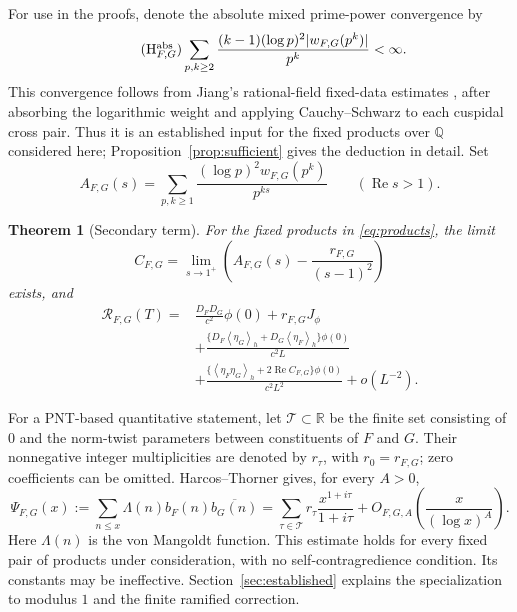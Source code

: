 \documentclass[11pt]{article}
\numberwithin{equation}{section}
\newtheorem{theorem}{Theorem}[section]
\theoremstyle{remark}
\newcommand{\R}{\mathbb R}
\newcommand{\Q}{\mathbb Q}
\newcommand{\Rea}{\operatorname{Re}}
\newcommand{\av}[1]{\left\langle #1\right\rangle_h}
\begin{document}
For use in the proofs, denote the absolute mixed prime-power convergence by
\begin{equation*}\tag{$\mathrm H_{F,G}^{\rm abs}$}\label{eq:Habs}
 \sum_{p,k\geq2}\frac{(k-1)(\log p)^2
              |w_{F,G}(p^k)|}{p^k}<\infty.
\end{equation*}
This convergence follows from Jiang's rational-field fixed-data
estimates \cite{Jiang}, after absorbing the logarithmic weight and
applying Cauchy--Schwarz to each cuspidal cross pair. Thus it is an
established input for the fixed products over $\Q$ considered here;
Proposition~\ref{prop:sufficient} gives the deduction in detail.
Set
\begin{equation}\label{eq:Aseries}
 A_{F,G}(s)=\sum_{p,k\geq1}
       \frac{(\log p)^2 w_{F,G}(p^k)}{p^{ks}}
       \qquad(\Rea s>1).
\end{equation}

\begin{theorem}[Secondary term]\label{thm:qualitative}
For the fixed products in \eqref{eq:products}, the limit
\begin{equation}\label{eq:C}
 C_{F,G}=\lim_{s\to1^+}
       \left(A_{F,G}(s)-\frac{r_{F,G}}{(s-1)^2}\right)
\end{equation}
exists, and
\begin{equation}\label{eq:main}
\begin{split}
 \mathcal R_{F,G}(T)={}&\frac{D_FD_G}{c^2}\phi(0)+r_{F,G}J_\phi\\
 &+\frac{\{D_F\av{\eta_G}+D_G\av{\eta_F}\}\phi(0)}{c^2L}\\
 &+\frac{\{\av{\eta_F\eta_G}+2\Rea C_{F,G}\}\phi(0)}{c^2L^2}
       +o(L^{-2}).
\end{split}
\end{equation}
\end{theorem}

For a PNT-based quantitative statement, let $\mathcal T\subset\R$
be the finite set consisting of $0$ and the norm-twist parameters
between constituents of $F$ and $G$. Their nonnegative integer
multiplicities are denoted by $r_\tau$, with $r_0=r_{F,G}$; zero
coefficients can be omitted. Harcos--Thorner \cite[Theorem 2.1]{HT}
gives, for every $A>0$,
\begin{equation}\label{eq:PNTrapid}
 \Psi_{F,G}(x):=\sum_{n\leq x}\Lambda(n)b_F(n)\overline{b_G(n)}
 =\sum_{\tau\in\mathcal T}r_\tau\frac{x^{1+i\tau}}{1+i\tau}
       +O_{F,G,A}\!\left(\frac{x}{(\log x)^A}\right).
\end{equation}
Here $\Lambda(n)$ is the von Mangoldt function. This estimate holds
for every fixed pair of products under consideration, with no
self-contragredience condition. Its constants may be ineffective.
Section~\ref{sec:established} explains the specialization to modulus
$1$ and the finite ramified correction.
\end{document}
